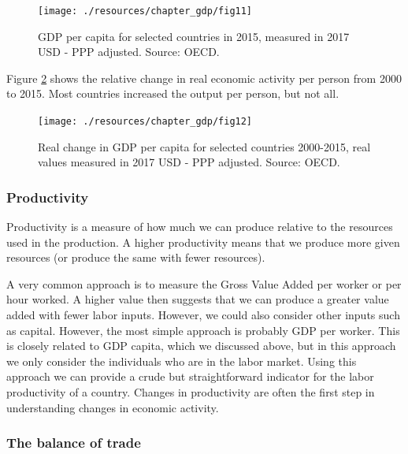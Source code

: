 \documentclass[
]{book}
\begin{document}
\begin{figure}

{\centering \texttt{[image: ./resources/chapter\_gdp/fig11]} 

}

\caption{GDP per capita for selected countries in 2015, measured in 2017 USD - PPP adjusted. Source: OECD. }\label{fig:gdp14}
\end{figure}

Figure \ref{fig:gdp15} shows the relative change in real economic activity per person from 2000 to 2015. Most countries increased the output per person, but not all.

\begin{figure}

{\centering \texttt{[image: ./resources/chapter\_gdp/fig12]} 

}

\caption{Real change in GDP per capita for selected countries 2000-2015, real values measured  in 2017 USD - PPP adjusted. Source: OECD.  }\label{fig:gdp15}
\end{figure}

\hypertarget{productivity}{%
\subsubsection*{Productivity}\label{productivity}}

Productivity is a measure of how much we can produce relative to the resources used in the production. A higher productivity means that we produce more given resources (or produce the same with fewer resources).

A very common approach is to measure the Gross Value Added per worker or per hour worked. A higher value then suggests that we can produce a greater value added with fewer labor inputs. However, we could also consider other inputs such as capital. However, the most simple approach is probably GDP per worker. This is closely related to GDP capita, which we discussed above, but in this approach we only consider the individuals who are in the labor market. Using this approach we can provide a crude but straightforward indicator for the labor productivity of a country. Changes in productivity are often the first step in understanding changes in economic activity.

\hypertarget{the-balance-of-trade}{%
\subsubsection*{The balance of trade}\label{the-balance-of-trade}}
\end{document}
